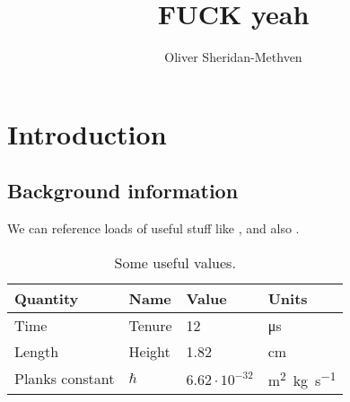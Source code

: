 \documentclass[english,twoside,10pt]{extarticle}
\title{FUCK yeah}
\author{Oliver Sheridan-Methven}
\begin{document}





\cleardoublepage %
\setcounter{section}{0}

\section{Introduction}
\subsection{Background information}
\lipsum[2]

We can reference loads of useful stuff like , and also .
\begin{table}[htb]
\centering
\begin{tabular}{llll}
Quantity & Name & Value & Units \\ \hline
Time & Tenure & 12 & \si{\micro\second} \\
Length & Height & 1.82 & \si{\centi\meter} \\
Planks constant & $ \hbar $ & $ 6.62\cdot10^{-32} $ & \si{\meter^2.\kilogram.\second^{-1}} \\
\end{tabular}
\caption{Some useful values.}
\label{tab:some_useful_values}
\end{table}
\end{document}
